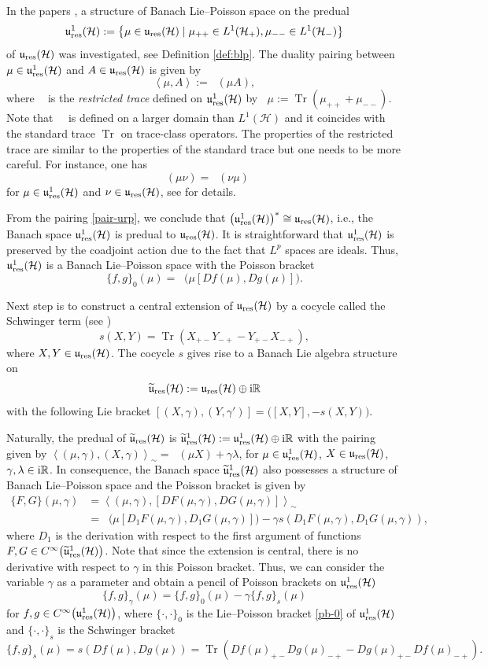 \documentclass[10pt,a4paper]{amsart}
\theoremstyle{definition}
\numberwithin{equation}{section}
\newcommand{\pair}[2]{\left\langle #1 , #2 \right\rangle}
\newcommand{\R}{\mathbb R}
\renewcommand{\H}{\mathcal{H}}
\newcommand{\ur}{\mathfrak u_{\textnormal{res}}(\H)}
\newcommand{\urp}{\mathfrak u_{\textnormal{res}}^1(\H)}
\newcommand{\urt}{\widetilde{\mathfrak u}_{\textnormal{res}}(\H)}
\newcommand{\urtp}{\widetilde{\mathfrak u}_{\textnormal{res}}^1(\H)}
\DeclareMathOperator{\Tr}{Tr}
\DeclareMathOperator{\Trr}{Tr_{res}}
\newcommand{\Lj}{L^1(\H)}
\newcommand{\Ljm}{L^1(\H_-)}\newcommand{\Ljp}{L^1(\H_+)}
\newcommand{\pb}{\{\cdot,\cdot\}}
\newcommand{\be}{\begin{equation}}
\newcommand{\ee}{\end{equation}}
\begin{document}
In the papers \cite{Ratiu-grass,Oext}, a structure of Banach Lie--Poisson space on the predual
\[
 \urp:=\bigl\{ \mu\in \ur \mid \mu_{++}\in \Ljp , \mu_{--}\in \Ljm\bigr\}
 \]
of $\ur$ was investigated, see Definition \ref{def:blp}.
The duality pairing between $\mu\in\urp$ and $A\in\ur$ is given by
\be \label{pair-urp}\pair\mu A:=\Trr(\mu A),\ee
where $\Trr$ is the \emph{restricted trace} defined on $\urp$ by
$\Trr \mu :=\Tr(\mu_{++}+\mu_{--})$.
Note that~$\Trr$ is defined on a larger domain than $\Lj$ and it coincides with the standard trace $\Tr$ on trace-class operators.
The properties of the restricted trace are similar to the properties of the standard trace but one needs to be more careful. For instance, one has
\be \label{trr-cyclic}\Trr(\mu\nu)=\Trr(\nu\mu)\ee
for $\mu\in\urp$ and $\nu\in\ur$,
see \cite{GO-grass} for details.

From the pairing \eqref{pair-urp}, we conclude that $\bigl(\urp\bigr)^*\cong \ur$, i.e., the Banach space
$\urp$ is predual to $\ur$.
It is straightforward that $\urp$ is preserved by the coadjoint action due to the fact that $L^p$ spaces are ideals. Thus, $\urp$ is a Banach Lie--Poisson space with the Poisson bracket
\be \label{pb-0}\{f,g\}_0(\mu) =
\Trr\bigl(\mu [Df(\mu),Dg(\mu)]\bigr).\ee

Next step is to construct a central extension of $\ur$ by a cocycle called the Schwinger term (see \cite{Ratiu-grass, GO-grass, mickelsson,schwinger, wurzbacher})
\be \label{schwinger}s(X,Y)=\Tr(X_{+-}Y_{-+}-Y_{+-}X_{-+}),\ee
where $X, Y \in \ur$.
The cocycle $s$ gives rise to a Banach Lie algebra structure on
\[\urt:=\ur\oplus {\rm i}\R\]
with the following Lie bracket
$ [(X,\gamma),(Y,\gamma')]=\bigl([X,Y],-s(X,Y)\bigr)$.

Naturally, the predual of $\urt$ is
$\urtp:=\urp\oplus {\rm i}\R$
with the pairing given by
$ \pair{(\mu,\gamma)}{(X,\gamma)}_{\sim}=\Trr(\mu X)+\gamma\lambda$,
for $\mu\in\urp$, $X\in\ur$, $\gamma,\lambda\in {\rm i}\R$.
In consequence, the Banach space $\urtp$ also possesses a structure of Banach Lie--Poisson space and the Poisson bracket is given by
\begin{align*}
 \{F,G\}(\mu,\gamma)& = \pair{(\mu,\gamma)}{[DF(\mu,\gamma),DG(\mu,\gamma)]}_\sim\\
& =\Trr\bigl(\mu [D_1F(\mu,\gamma),D_1G(\mu,\gamma)]\bigr)-\gamma s(D_1F(\mu,\gamma),D_1G(\mu,\gamma)),
\end{align*}
where $D_1$ is the derivation with respect to the first argument of functions $F,G\in C^\infty\bigl(\urtp\bigr)$.
Note that since the extension is central, there is no derivative with respect to $\gamma$ in this Poisson bracket. Thus, we can
consider the variable $\gamma$ as a parameter and obtain a pencil of Poisson brackets on $\urp$
\be \label{pb-pencil}\{f,g\}_\gamma(\mu) =
\{f,g\}_0(\mu) - \gamma \{f,g\}_s(\mu) \ee
for $f,g\in C^\infty\bigl(\urp\bigr)$, where $\pb_0$ is the Lie--Poisson bracket \eqref{pb-0} of $\urp$ and $\pb_s$ is the Schwinger bracket
\be \label{pb-s}\{f,g\}_s(\mu) = s(Df(\mu),Dg(\mu))= \Tr (Df(\mu)_{+-}Dg(\mu)_{-+} - Dg(\mu)_{+-}Df(\mu)_{-+}).\ee
\end{document}
